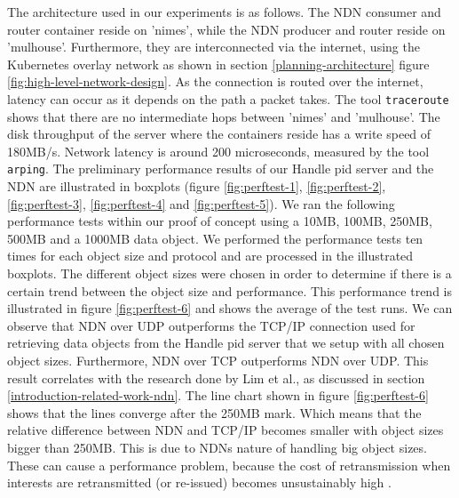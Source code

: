 The architecture used in our experiments is as follows. The NDN consumer and router container reside on 'nimes', while the NDN producer and router reside on 'mulhouse'. Furthermore, they are interconnected via the internet, using the Kubernetes overlay network as shown in section \ref{planning-architecture} figure \ref{fig:high-level-network-design}. As the connection is routed over the internet, latency can occur as it depends on the path a packet takes. The tool \texttt{traceroute} shows that there are no intermediate hops between 'nimes' and 'mulhouse'. The disk throughput of the server where the containers reside has a write speed of 180MB/s. Network latency is around 200 microseconds, measured by the tool \texttt{arping}.
The preliminary performance results of our Handle \gls{pid} server and the NDN are illustrated in boxplots (figure \ref{fig:perftest-1}, \ref{fig:perftest-2}, \ref{fig:perftest-3}, \ref{fig:perftest-4} and \ref{fig:perftest-5}). We ran the following performance tests within our proof of concept using a 10MB, 100MB, 250MB, 500MB and a 1000MB data object. We performed the performance tests ten times for each object size and protocol and are processed in the illustrated boxplots. The different object sizes were chosen in order to determine if there is a certain trend between the object size and performance. This performance trend is illustrated in figure \ref{fig:perftest-6} and shows the average of the test runs. We can observe that NDN over UDP outperforms the TCP/IP connection used for retrieving data objects from the Handle \gls{pid} server that we setup with all chosen object sizes. Furthermore, NDN over TCP outperforms NDN over UDP. This result correlates with the research done by Lim et al., as discussed in section \ref{introduction-related-work-ndn}. The line chart shown in figure \ref{fig:perftest-6} shows that the lines converge after the 250MB mark. Which means that the relative difference between NDN and TCP/IP becomes smaller with object sizes bigger than 250MB. This is due to NDNs nature of handling big object sizes. These can cause a performance problem, because the cost of retransmission when interests are retransmitted (or re-issued) becomes unsustainably high \cite{ndn-objects}. %

